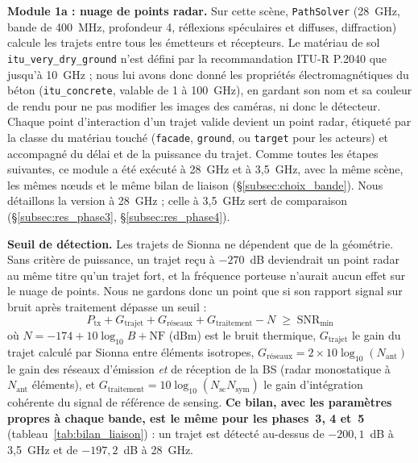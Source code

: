 \documentclass[12pt,a4paper,titlepage]{article}
\begin{document}
\textbf{Module 1a : nuage de points radar.} Sur cette scène, \texttt{PathSolver} (28~GHz, bande de 400~MHz, profondeur 4, réflexions spéculaires et diffuses, diffraction) calcule les trajets entre tous les émetteurs et récepteurs. Le matériau de sol \texttt{itu\_very\_dry\_ground} n'est défini par la recommandation ITU-R P.2040 que jusqu'à 10~GHz ; nous lui avons donc donné les propriétés électromagnétiques du béton (\texttt{itu\_concrete}, valable de 1 à 100~GHz), en gardant son nom et sa couleur de rendu pour ne pas modifier les images des caméras, ni donc le détecteur. Chaque point d'interaction d'un trajet valide devient un point radar, étiqueté par la classe du matériau touché (\texttt{facade}, \texttt{ground}, ou \texttt{target} pour les acteurs) et accompagné du délai et de la puissance du trajet. Comme toutes les étapes suivantes, ce module a été exécuté à 28~GHz et à 3,5~GHz, avec la même scène, les mêmes n\oe uds et le même bilan de liaison (\S\ref{subsec:choix_bande}). Nous détaillons la version à 28~GHz ; celle à 3,5~GHz sert de comparaison (\S\ref{subsec:res_phase3}, \S\ref{subsec:res_phase4}).

\textbf{Seuil de détection.} Les trajets de Sionna ne dépendent que de la géométrie. Sans critère de puissance, un trajet reçu à $-270$~dB deviendrait un point radar au même titre qu'un trajet fort, et la fréquence porteuse n'aurait aucun effet sur le nuage de points. Nous ne gardons donc un point que si son rapport signal sur bruit après traitement dépasse un seuil :
\begin{equation}
    P_{\mathrm{tx}} + G_{\mathrm{trajet}} + G_{\mathrm{réseaux}} + G_{\mathrm{traitement}} - N \;\geq\; \mathrm{SNR}_{\min}
    \label{eq:seuil_detection}
\end{equation}
où $N = -174 + 10\log_{10} B + \mathrm{NF}$ (dBm) est le bruit thermique, $G_{\mathrm{trajet}}$ le gain du trajet calculé par Sionna entre éléments isotropes, $G_{\mathrm{réseaux}} = 2 \times 10\log_{10}(N_{\mathrm{ant}})$ le gain des réseaux d'émission \emph{et} de réception de la BS (radar monostatique à $N_{\mathrm{ant}}$ éléments), et $G_{\mathrm{traitement}} = 10\log_{10}(N_{\mathrm{sc}} N_{\mathrm{sym}})$ le gain d'intégration cohérente du signal de référence de sensing. \textbf{Ce bilan, avec les paramètres propres à chaque bande, est le même pour les phases~3, 4 et~5} (tableau~\ref{tab:bilan_liaison}) : un trajet est détecté au-dessus de $-200{,}1$~dB à 3,5~GHz et de $-197{,}2$~dB à 28~GHz.
\end{document}
